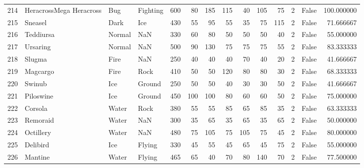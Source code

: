 \begin{tabular}{rlllrrrrrrrrlr}
 214 &    HeracrossMega Heracross &       Bug &  Fighting &    600 &   80 &     185 &      115 &       40 &      105 &     75 &           2 &      False &  100.000000 \\
 215 &                    Sneasel &      Dark &       Ice &    430 &   55 &      95 &       55 &       35 &       75 &    115 &           2 &      False &   71.666667 \\
 216 &                  Teddiursa &    Normal &       NaN &    330 &   60 &      80 &       50 &       50 &       50 &     40 &           2 &      False &   55.000000 \\
 217 &                   Ursaring &    Normal &       NaN &    500 &   90 &     130 &       75 &       75 &       75 &     55 &           2 &      False &   83.333333 \\
 218 &                     Slugma &      Fire &       NaN &    250 &   40 &      40 &       40 &       70 &       40 &     20 &           2 &      False &   41.666667 \\
 219 &                   Magcargo &      Fire &      Rock &    410 &   50 &      50 &      120 &       80 &       80 &     30 &           2 &      False &   68.333333 \\
 220 &                     Swinub &       Ice &    Ground &    250 &   50 &      50 &       40 &       30 &       30 &     50 &           2 &      False &   41.666667 \\
 221 &                  Piloswine &       Ice &    Ground &    450 &  100 &     100 &       80 &       60 &       60 &     50 &           2 &      False &   75.000000 \\
 222 &                    Corsola &     Water &      Rock &    380 &   55 &      55 &       85 &       65 &       85 &     35 &           2 &      False &   63.333333 \\
 223 &                   Remoraid &     Water &       NaN &    300 &   35 &      65 &       35 &       65 &       35 &     65 &           2 &      False &   50.000000 \\
 224 &                  Octillery &     Water &       NaN &    480 &   75 &     105 &       75 &      105 &       75 &     45 &           2 &      False &   80.000000 \\
 225 &                   Delibird &       Ice &    Flying &    330 &   45 &      55 &       45 &       65 &       45 &     75 &           2 &      False &   55.000000 \\
 226 &                    Mantine &     Water &    Flying &    465 &   65 &      40 &       70 &       80 &      140 &     70 &           2 &      False &   77.500000 \\

\end{tabular}
